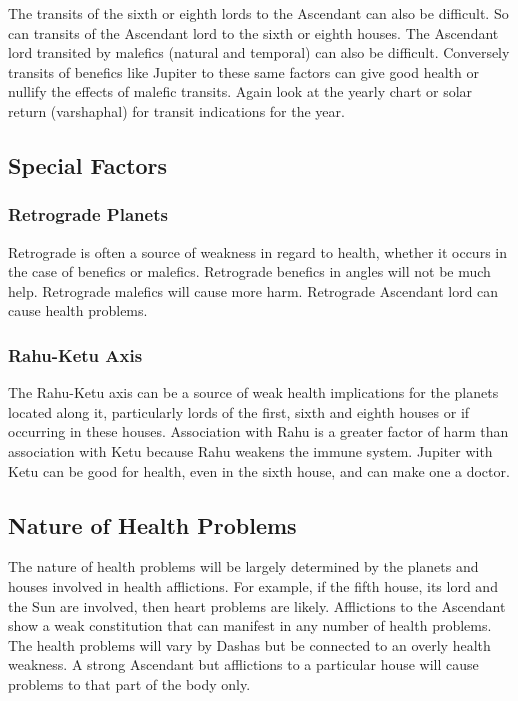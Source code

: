 The transits of the sixth or eighth lords to the Ascendant can also be difficult. So can transits of the Ascendant lord to the sixth or eighth houses. The Ascendant lord transited by malefics (natural and temporal) can also be difficult. Conversely transits of benefics like Jupiter to these same factors can give good health or nullify the effects of malefic transits. Again look at the yearly chart or solar return (varshaphal) for transit indications for the year.

 

\subsection{Special Factors}
 

\subsubsection{Retrograde Planets}

Retrograde is often  a source of weakness in regard to health, whether it occurs in the case of benefics or malefics. Retrograde benefics in angles will not be much help. Retrograde malefics will cause more harm. Retrograde Ascendant lord can cause health problems.

 

\subsubsection{Rahu-Ketu Axis}

The Rahu-Ketu axis can be a source of weak health implications for the planets located along it, particularly lords of the first, sixth and eighth houses or if occurring in these houses. Association with Rahu is a greater factor of harm than association with Ketu because Rahu weakens the immune system. Jupiter with Ketu can be good for health, even in the sixth house, and can make one a doctor.

 

\subsection{Nature of Health Problems}
 

The nature of health problems  will be largely determined by the planets and houses involved in health afflictions. For example, if the fifth house, its lord and the Sun are involved, then heart problems are likely. Afflictions to the Ascendant show a weak constitution that can manifest in any number of health problems. The health problems will vary by Dashas but be connected to an overly health weakness. A strong Ascendant but afflictions to a particular house will cause problems to that part of the body only.

